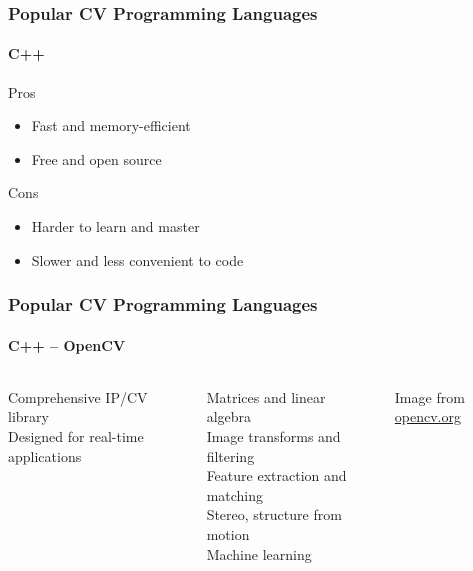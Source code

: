 \documentclass[xetex,professionalfont]{beamer}
\begin{document}

\begin{frame}
\frametitle{Popular CV Programming Languages}
\framesubtitle{C++}

Pros
\begin{itemize}
	\item Fast and memory-efficient
	\item Free and open source
\end{itemize}

\bigskip
Cons
\begin{itemize}
	\item Harder to learn and master
	\item Slower and less convenient to code
\end{itemize}

\end{frame}


\begin{frame}
\frametitle{Popular CV Programming Languages}
\framesubtitle{C++ -- OpenCV}

\begin{columns}

Comprehensive IP/CV library\\
Designed for real-time applications

\bigskip
Matrices and linear algebra\\\medskip
Image transforms and filtering\\\medskip
Feature extraction and matching\\\medskip
Stereo, structure from motion\\\medskip
Machine learning %


\begin{center}
{
	{\centering Image from \url{opencv.org}}}
\end{center}

\end{columns}

\end{frame}
\end{document}
